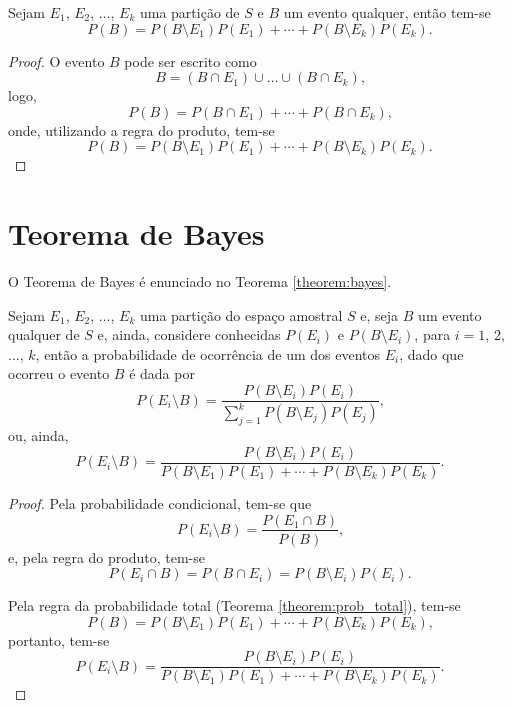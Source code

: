 \begin{theorem}
\label{theorem:prob_total}
	Sejam $E_1$, $E_2$, $\dots$, $E_k$ uma partição de $S$ e $B$ um evento qualquer, então tem-se
	\[
		P(B) = P(B\setminus E_1)P(E_1)
		+ \cdots
		+ P(B\setminus E_k)P(E_k)
		\text{.}
	\]

	\begin{proof}
	O evento $B$ pode ser escrito como
	\[
		B = (B\cap E_1)\cup \dots \cup (B\cap E_k)\text{,}
	\]
	logo,
	\[
		P(B)=P(B\cap E_1)+\cdots+P(B\cap E_k)\text{,}
	\]
	onde, utilizando a regra do produto, tem-se
	\[
		P(B)=P(B\setminus E_1)P(E_1)+\cdots+P(B\setminus E_k)P(E_k)\text{.}
	\]
	\end{proof}
\end{theorem}

\section{Teorema de Bayes}

O Teorema de Bayes é enunciado no Teorema \ref{theorem:bayes}.

\begin{theorem}
	\label{theorem:bayes}
	Sejam $E_1$, $E_2$, $\dots$, $E_k$ uma partição do espaço amostral $S$ e, seja $B$ um evento qualquer de $S$ e, ainda, considere conhecidas $P(E_i)$ e $P(B\setminus E_i)$, para $i=1$, $2$, $\dots$, $k$, então a probabilidade de ocorrência de um dos eventos $E_i$, dado que ocorreu o evento $B$ é dada por
	\[
		P(E_i\setminus B)=\frac{
			P(B\setminus E_i)P(E_i)
		} {
			\displaystyle \sum_{j=1}^{k} P(B\setminus E_j)P(E_j)
		}
		\text{,}
	\]
	ou, ainda,
	\[
		P(E_i\setminus B)=\frac{
			P(B\setminus E_i)P(E_i)
		}{
			P(B\setminus E_1)P(E_1)
			+
			\cdots
			+
			P(B\setminus E_k)P(E_k)
		}
		\text{.}
	\]
	
	\begin{proof}
		Pela probabilidade condicional, tem-se que
		\[
			P(E_i\setminus B)=\frac{P(E_1\cap B)}{P(B)}\text{,}
		\]
		e, pela regra do produto, tem-se
		\[
			P(E_i\cap B) = P(B\cap E_i)=P(B\setminus E_i)P(E_i)\text{.}
		\]
		
		Pela regra da probabilidade total (Teorema \ref{theorem:prob_total}), tem-se
		\[
			P(B) = P(B\setminus E_1)P(E_1)+\cdots + P(B\setminus E_k)P(E_k)\text{,}
		\]
		portanto, tem-se
		\[
			P(E_i\setminus B)=\frac{
				P(B\setminus E_i)P(E_i)
			}{
				P(B\setminus E_1)P(E_1)
				+
				\cdots
				+
				P(B\setminus E_k)P(E_k)
			}
			\text{.}
		\]
	\end{proof}
\end{theorem}

